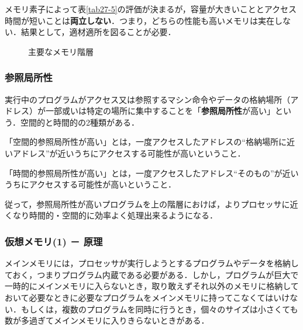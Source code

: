 メモリ素子によって表\ref{tab27-5}の評価が決まるが，容量が大きいこととアクセス時間が短いことは\textbf{両立しない}．つまり，どちらの性能も高いメモリは実在しない．結果として，適材適所を図ることが必要．

\begin{figure}[H]
	\begin{center}
		\caption{主要なメモリ階層}
		\label{fig27-6}
	\end{center}
\end{figure}



\subsubsection{参照局所性}\label{sec27-2-D-4}

実行中のプログラムがアクセス又は参照するマシン命令やデータの格納場所（アドレス）が一部或いは特定の場所に集中することを「\textbf{参照局所性}が高い」という．空間的と時間的の2種類がある．
\begin{enumerate}[label=\textbf{[\arabic*]}, labelsep=10pt, leftmargin=23pt]
	\item 「空間的参照局所性が高い」とは，一度アクセスしたアドレスの“格納場所に近いアドレス”が近いうちにアクセスする可能性が高いということ．
	\item 「時間的参照局所性が高い」とは，一度アクセスしたアドレス“そのもの”が近いうちにアクセスする可能性が高いということ．
\end{enumerate}

従って，参照局所性が高いプログラムを上の階層におけば，よりプロセッサに近くなり時間的・空間的に効率よく処理出来るようになる．



\subsubsection{仮想メモリ(1) － 原理}\label{sec27-2-D-5}

メインメモリには，プロセッサが実行しようとするプログラムやデータを格納しておく，つまりプログラム内蔵である必要がある．しかし，プログラムが巨大で一時的にメインメモリに入らないとき，取り敢えずそれ以外のメモリに格納しておいて必要なときに必要なプログラムをメインメモリに持ってこなくてはいけない．もしくは，複数のプログラムを同時に行うとき，個々のサイズは小さくても数が多過ぎてメインメモリに入りきらないときがある．

